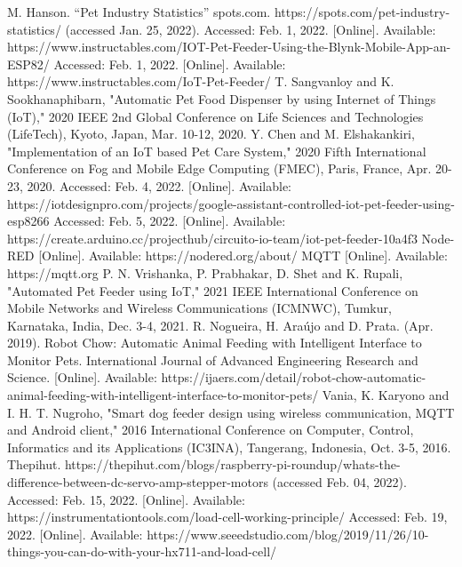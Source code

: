 \documentclass[conference]{IEEEtran}
\begin{document}
\begin{thebibliography}{00}
M.  Hanson.  “Pet  Industry  Statistics”  spots.com.  https://spots.com/pet-industry-statistics/ (accessed Jan. 25, 2022). 
Accessed: Feb. 1, 2022. [Online]. Available: https://www.instructables.com/IOT-Pet-Feeder-Using-the-Blynk-Mobile-App-an-ESP82/
Accessed: Feb. 1, 2022. [Online]. Available: https://www.instructables.com/IoT-Pet-Feeder/
T. Sangvanloy and K. Sookhanaphibarn, "Automatic Pet Food Dispenser by using Internet of Things (IoT)," 2020 IEEE 2nd Global Conference on Life Sciences and Technologies (LifeTech), Kyoto, Japan, Mar. 10-12, 2020.
Y. Chen and M. Elshakankiri, "Implementation of an IoT based Pet Care System," 2020 Fifth International Conference on Fog and Mobile Edge Computing (FMEC), Paris, France, Apr. 20-23, 2020.
Accessed: Feb. 4, 2022. [Online]. Available: https://iotdesignpro.com/projects/google-assistant-controlled-iot-pet-feeder-using-esp8266
Accessed: Feb. 5, 2022. [Online]. Available: https://create.arduino.cc/projecthub/circuito-io-team/iot-pet-feeder-10a4f3
Node-RED [Online]. Available: https://nodered.org/about/
MQTT [Online]. Available: https://mqtt.org
P. N. Vrishanka, P. Prabhakar, D. Shet and K. Rupali, "Automated Pet Feeder using IoT," 2021 IEEE International Conference on Mobile Networks and Wireless Communications (ICMNWC), Tumkur, Karnataka, India, Dec. 3-4, 2021.
R. Nogueira, H. Araújo and D. Prata. (Apr. 2019). Robot Chow: Automatic Animal Feeding with Intelligent Interface to Monitor Pets. International Journal of Advanced Engineering Research and Science. [Online]. Available: https://ijaers.com/detail/robot-chow-automatic-animal-feeding-with-intelligent-interface-to-monitor-pets/
Vania, K. Karyono and I. H. T. Nugroho, "Smart dog feeder design using wireless communication, MQTT and Android client," 2016 International Conference on Computer, Control, Informatics and its Applications (IC3INA), Tangerang, Indonesia, Oct. 3-5, 2016.
Thepihut. https://thepihut.com/blogs/raspberry-pi-roundup/whats-the-difference-between-dc-servo-amp-stepper-motors (accessed Feb. 04, 2022).
Accessed: Feb. 15, 2022. [Online]. Available: https://instrumentationtools.com/load-cell-working-principle/
Accessed: Feb. 19, 2022. [Online]. Available: https://www.seeedstudio.com/blog/2019/11/26/10-things-you-can-do-with-your-hx711-and-load-cell/

\end{thebibliography}
\end{document}
